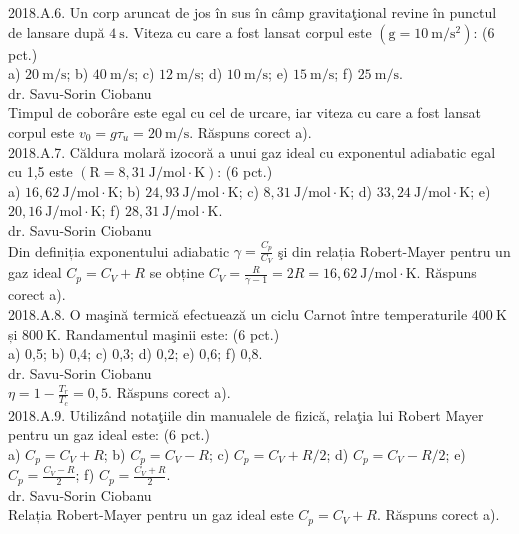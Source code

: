 2018.A.6. Un corp aruncat de jos în sus în câmp gravitaţional revine în punctul de lansare după $4 \mathrm{~s}$. Viteza cu care a fost lansat corpul este $\left(\mathrm{g}=10 \mathrm{~m} / \mathrm{s}^{2}\right)$: (6 pct.)\\ a) $20 \mathrm{~m} / \mathrm{s}$; b) $40 \mathrm{~m} / \mathrm{s}$; c) $12 \mathrm{~m} / \mathrm{s}$; d) $10 \mathrm{~m} / \mathrm{s}$; e) $15 \mathrm{~m} / \mathrm{s}$; f) $25 \mathrm{~m} / \mathrm{s}$.\\ dr. Savu-Sorin Ciobanu\\ Timpul de coborâre este egal cu cel de urcare, iar viteza cu care a fost lansat corpul este $v_{0}=g \tau_{u}=20 \mathrm{~m} / \mathrm{s}$. Răspuns corect a).\\

2018.A.7. Căldura molară izocoră a unui gaz ideal cu exponentul adiabatic egal cu 1,5 este $(\mathrm{R}=8,31 \mathrm{~J} / \mathrm{mol} \cdot \mathrm{K})$: (6 pct.)\\ a) $16,62 \mathrm{~J} / \mathrm{mol} \cdot \mathrm{K}$; b) $24,93 \mathrm{~J} / \mathrm{mol} \cdot \mathrm{K}$; c) $8,31 \mathrm{~J} / \mathrm{mol} \cdot \mathrm{K}$; d) $33,24 \mathrm{~J} / \mathrm{mol} \cdot \mathrm{K}$; e) $20,16 \mathrm{~J} / \mathrm{mol} \cdot \mathrm{K}$; f) $28,31 \mathrm{~J} / \mathrm{mol} \cdot \mathrm{K}$.\\ dr. Savu-Sorin Ciobanu\\  Din definiția exponentului adiabatic $\gamma=\frac{C_{p}}{C_{V}}$ şi din relația Robert-Mayer pentru un gaz ideal $C_{p}=C_{V}+R$ se obține $C_{V}=\frac{R}{\gamma-1}=2 R=16,62 \mathrm{~J} / \mathrm{mol} \cdot \mathrm{K}$. Răspuns corect a).\\

2018.A.8. O maşină termică efectuează un ciclu Carnot între temperaturile $400 \mathrm{~K}$ și $800 \mathrm{~K}$. Randamentul maşinii este: (6 pct.)\\ a) 0,5; b) 0,4; c) 0,3; d) 0,2; e) 0,6; f) 0,8.\\ dr. Savu-Sorin Ciobanu\\ $\eta=1-\frac{T_{r}}{T_{c}}=0,5$. Răspuns corect a).\\

2018.A.9. Utilizând notaţiile din manualele de fizică, relaţia lui Robert Mayer pentru un gaz ideal este: (6 pct.)\\ a) $C_{p}=C_{V}+R$; b) $C_{p}=C_{V}-R$; c) $C_{p}=C_{V}+R / 2$; d) $C_{p}=C_{V}-R / 2$; e) $C_{p}=\frac{C_{V}-R}{2}$; f) $C_{p}=\frac{C_{V}+R}{2}$.\\ dr. Savu-Sorin Ciobanu\\ Relația Robert-Mayer pentru un gaz ideal este $C_{p}=C_{V}+R$. Răspuns corect a).\\

